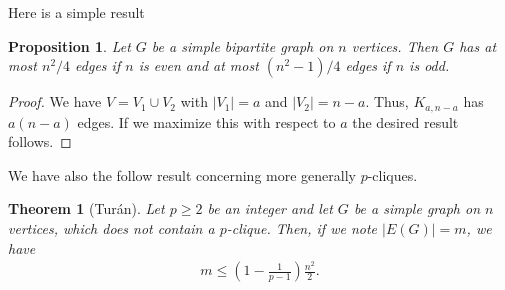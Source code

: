 \documentclass[12pt,a4paper]{article}
\newtheorem{thm}{Theorem}[section]
\newtheorem{prop}{Proposition}[section]
\theoremstyle{definition}
\begin{document}
Here is a simple result
\begin{prop} Let $G$ be a simple bipartite graph on $n$ vertices. Then $G$ has at most $n^2/4$ edges if $n$ is even and at most $(n^2-1)/4$ edges if $n$ is odd.
\end{prop}
\begin{proof}
We have $V= V_1 \cup V_2$ with $|V_1|=a$ and $|V_2|=n-a$. Thus, $K_{a,n-a}$ has $a(n-a)$ edges. If we maximize this with respect to $a$ the desired result follows. 
\end{proof}
We have also the follow result concerning more generally $p$-cliques.
\begin{thm}[Turán] Let $p \geq 2$ be an integer and let $G$ be a simple graph on $n$ vertices, which does not contain a $p$-clique. Then, if we note $|E(G)|=m$, we have
\begin{align*}
m \leq \left( 1 - \frac{1}{p-1}\right) \frac{n^2}{2}.
\end{align*}
\end{thm}
\end{document}

